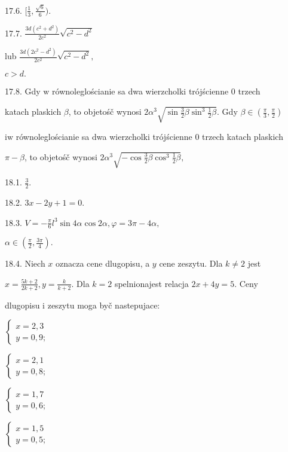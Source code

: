 \documentclass[a4paper,12pt]{article}
\begin{document}
17.6. $[\displaystyle \frac{1}{3},\frac{\sqrt{6}}{6}).$

17.7. $\displaystyle \frac{3d(c^{2}+d^{2})}{2c^{2}}\sqrt{c^{2}-d^{2}}$

lub $\displaystyle \frac{3d(2c^{2}-d^{2})}{2c^{2}}\sqrt{c^{2}-d^{2}},$

$c>d.$

17.8. Gdy $\mathrm{w}$ równoleglościanie sa dwa wierzcholki trójścienne $0$ trzech

katach plaskich $\beta$, to objetośč wynosi $2\alpha^{3}\sqrt{\sin\frac{3}{2}\beta\sin^{3}\frac{1}{2}\beta}$. Gdy $\beta\in (\displaystyle \frac{\pi}{3},\frac{\pi}{2})$

$\mathrm{i}\mathrm{w}$ równoleglościanie sa dwa wierzcholki trójścienne $0$ trzech katach plaskich

$\pi-\beta$, to objetośč wynosi $2\alpha^{3}\sqrt{-\cos\frac{3}{2}\beta\cos^{3}\frac{1}{2}\beta},$

18.1. $\displaystyle \frac{3}{2}.$

18.2. $3x-2y+1=0.$

18.3. $V=-\displaystyle \frac{\pi}{6}l^{3}\sin 4\alpha\cos 2\alpha, \varphi=3\pi-4\alpha,$

$\alpha\in (\displaystyle \frac{\pi}{2},\frac{3\pi}{4}).$

18.4. Niech $x$ oznacza cene dlugopisu, a $y$ cene zeszytu. Dla $k\neq 2$ jest

$x=\displaystyle \frac{5k+2}{2k+2}, y=\displaystyle \frac{k}{k+2}$. Dla $k=2$ spelnionajest relacja $2x+4y=5$. Ceny

dlugopisu $\mathrm{i}$ zeszytu moga byč nastepujace:

$\left\{\begin{array}{l}
x=2,3\\
y=0,9;
\end{array}\right.$

$\left\{\begin{array}{l}
x=2,1\\
y=0,8;
\end{array}\right.$

$\left\{\begin{array}{l}
x=1,7\\
y=0,6;
\end{array}\right.$

$\left\{\begin{array}{l}
x=1,5\\
y=0,5;
\end{array}\right.$
\end{document}
